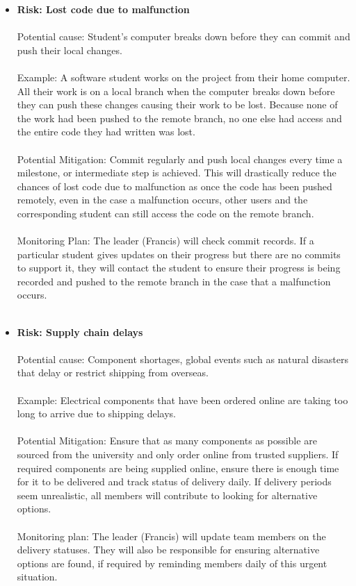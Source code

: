 \begin{itemize}
\item\textbf{Risk: Lost code due to malfunction}
\\
\\ Potential cause: Student’s computer breaks down before they can commit and push their local changes.
\\
\\ Example: A software student works on the project from their home computer. All their work is on a local branch when the computer breaks down before they can push these changes causing their work to be lost. Because none of the work had been pushed to the remote branch, no one else had access and the entire code they had written was lost.
\\
\\ Potential Mitigation: Commit regularly and push local changes every time a milestone, or intermediate step is achieved. This will drastically reduce the chances of lost code due to malfunction as once the code has been pushed remotely, even in the case a malfunction occurs, other users and the corresponding student can still access the code on the remote branch.
\\
\\ Monitoring Plan: The leader (Francis) will check commit records. If a particular student gives updates on their progress but there are no commits to support it, they will contact the student to ensure their progress is being recorded and pushed to the remote branch in the case that a malfunction occurs.
\\
\\

\item\textbf{Risk: Supply chain delays}
\\
\\ Potential cause: Component shortages, global events such as natural disasters that delay or restrict shipping from overseas.
\\
\\ Example: Electrical components that have been ordered online are taking too long to arrive due to shipping delays.
\\
\\ Potential Mitigation: Ensure that as many components as possible are sourced from the university and only order online from trusted suppliers. If required components are being supplied online, ensure there is enough time for it to be delivered and track status of delivery daily. If delivery periods seem unrealistic, all members will contribute to looking for alternative options.
\\
\\ Monitoring plan: The leader (Francis) will update team members on the delivery statuses. They will also be responsible for ensuring alternative options are found, if required by reminding members daily of this urgent situation.
\\
\\

\end{itemize}